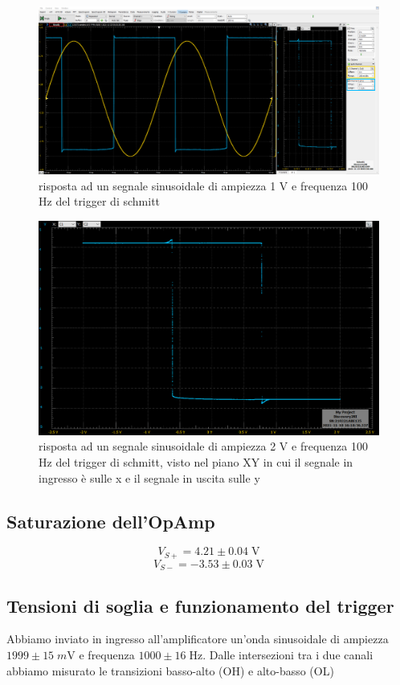 \documentclass[10pt,a4paper]{article}
\begin{document}
\begin{figure}[htbp]
\centering
\includegraphics[scale=0.335]{schmitt}
\caption{risposta ad un segnale sinusoidale di ampiezza 1 V e frequenza 100 Hz del trigger di schmitt}
\end{figure}

\begin{figure}[htbp]
\centering
\includegraphics[scale=0.4]{shmitt_isteresi}
\caption{risposta ad un segnale sinusoidale di ampiezza 2 V e frequenza 100 Hz del trigger di schmitt, visto nel piano XY in cui il segnale in ingresso è sulle x e il segnale in uscita sulle y}
\end{figure}


\subsection{Saturazione dell'OpAmp}

\[
V_{S+} = 4.21 \pm 0.04 \; \si{\V}
\]
\[
V_{S-} = -3.53 \pm 0.03 \; \si{\V}
\]
\subsection{Tensioni di soglia e funzionamento del trigger}
Abbiamo inviato in ingresso all'amplificatore un'onda sinusoidale di ampiezza
$1999 \pm 15 \; \si{m\V}$ e frequenza $1000 \pm 16 \; \si{\Hz}$.
Dalle intersezioni tra i due canali abbiamo misurato le transizioni basso-alto
(OH) e alto-basso (OL)
\end{document}
